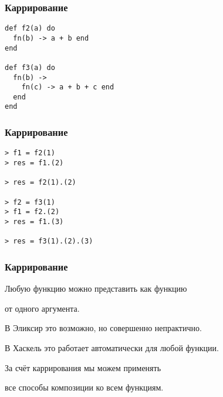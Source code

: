 \documentclass[10pt]{beamer}
\begin{document}
\begin{frame}[fragile]
  \frametitle{Каррирование}
  \begin{lstlisting}
def f2(a) do
  fn(b) -> a + b end
end

def f3(a) do
  fn(b) ->
    fn(c) -> a + b + c end
  end
end
  \end{lstlisting}
\end{frame}

\begin{frame}[fragile]
  \frametitle{Каррирование}
  \begin{lstlisting}
> f1 = f2(1)
> res = f1.(2)

> res = f2(1).(2)

> f2 = f3(1)
> f1 = f2.(2)
> res = f1.(3)

> res = f3(1).(2).(3)
  \end{lstlisting}
\end{frame}

\begin{frame}
  \frametitle{Каррирование}
  Любую функцию можно представить как функцию
  \par
  от одного аргумента.
  \par \bigskip
  В Эликсир это возможно, но совершенно непрактично.
  \par \bigskip
  В Хаскель это работает автоматически для любой функции.
  \par \bigskip
  За счёт каррирования мы можем применять
  \par
  все способы композиции ко всем функциям.
\end{frame}

\begin{frame}
  \frametitle{}
\end{frame}

\begin{frame}
  \frametitle{}
\end{frame}
\end{document}
